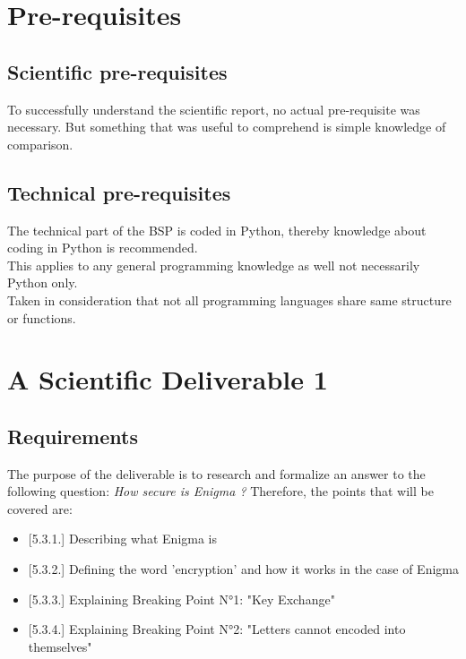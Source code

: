 \documentclass[conference,compsoc]{IEEEtran}
\begin{document}

\section{Pre-requisites}

\subsection{Scientific pre-requisites}
To successfully understand the scientific report, no actual pre-requisite was necessary.
But something that was useful to comprehend is simple knowledge of comparison.
\subsection{Technical pre-requisites}
The technical part of the BSP is coded in Python, thereby knowledge about coding in Python is recommended.\\
This applies to any general programming knowledge as well not necessarily Python only.\\
Taken in consideration that not all programming languages share same structure or functions.\\


\section{ A Scientific Deliverable 1}
\label{sec-production}
\subsection{Requirements}
The purpose of the deliverable is to research and formalize an answer to the following question:
\emph{How secure is Enigma ?}
Therefore, the points that will be covered are:
\begin{itemize}
    \item{[5.3.1.]} Describing what Enigma is
    \item{[5.3.2.]} Defining the word 'encryption' and how it works in the case of Enigma
    \item{[5.3.3.]} Explaining Breaking Point N°1: "Key Exchange"
    \item{[5.3.4.]} Explaining Breaking Point N°2: "Letters cannot encoded into themselves"
\end{itemize}
\end{document}
